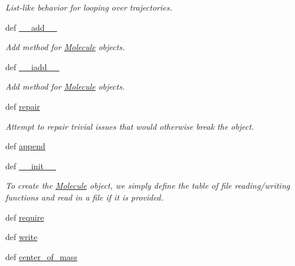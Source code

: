 \begin{DoxyCompactItemize}
\begin{DoxyCompactList}\small\item\em List-\/like behavior for looping over trajectories. \end{DoxyCompactList}\item 
def \hyperlink{classforcebalance_1_1molecule_1_1Molecule_a3e82ae8215555b543f1e5800b718c409}{\-\_\-\-\_\-add\-\_\-\-\_\-}
\begin{DoxyCompactList}\small\item\em Add method for \hyperlink{classforcebalance_1_1molecule_1_1Molecule}{Molecule} objects. \end{DoxyCompactList}\item 
def \hyperlink{classforcebalance_1_1molecule_1_1Molecule_ae1bcdf1cc78a6cc165de80bacc7b69c5}{\-\_\-\-\_\-iadd\-\_\-\-\_\-}
\begin{DoxyCompactList}\small\item\em Add method for \hyperlink{classforcebalance_1_1molecule_1_1Molecule}{Molecule} objects. \end{DoxyCompactList}\item 
def \hyperlink{classforcebalance_1_1molecule_1_1Molecule_ac1cdd5bcc81b6a9f56d89fd8a4225211}{repair}
\begin{DoxyCompactList}\small\item\em Attempt to repair trivial issues that would otherwise break the object. \end{DoxyCompactList}\item 
def \hyperlink{classforcebalance_1_1molecule_1_1Molecule_a77417ff99b19f6d0b7c6f527e83fa7f1}{append}
\item 
def \hyperlink{classforcebalance_1_1molecule_1_1Molecule_a3f8233f4e9911d7af0f17ca66c16ff92}{\-\_\-\-\_\-init\-\_\-\-\_\-}
\begin{DoxyCompactList}\small\item\em To create the \hyperlink{classforcebalance_1_1molecule_1_1Molecule}{Molecule} object, we simply define the table of file reading/writing functions and read in a file if it is provided. \end{DoxyCompactList}\item 
def \hyperlink{classforcebalance_1_1molecule_1_1Molecule_a80851250d8e749bea882d5aa4bcfcdd1}{require}
\item 
def \hyperlink{classforcebalance_1_1molecule_1_1Molecule_a4ecfdf28aacff9c081dd50cd4ac84f89}{write}
\item 
def \hyperlink{classforcebalance_1_1molecule_1_1Molecule_a6aa22586a5590f63ea20e269e3f195a5}{center\-\_\-of\-\_\-mass}

\end{DoxyCompactItemize}
